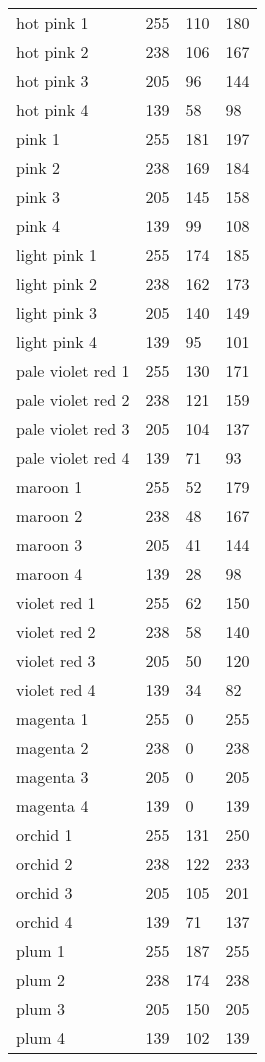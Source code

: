 \begin{center}
\begin{tabular}{llll}
  hot pink 1 & 255 & 110 & 180  \\
  hot pink 2 & 238 & 106 & 167  \\
  hot pink 3 & 205 & 96 & 144  \\
  hot pink 4 & 139 & 58 & 98  \\
  pink 1 & 255 & 181 & 197  \\
  pink 2 & 238 & 169 & 184  \\
  pink 3 & 205 & 145 & 158  \\
  pink 4 & 139 & 99 & 108  \\
  light pink 1 & 255 & 174 & 185  \\
  light pink 2 & 238 & 162 & 173  \\
  light pink 3 & 205 & 140 & 149  \\
  light pink 4 & 139 & 95 & 101  \\
  pale violet red 1 & 255 & 130 & 171  \\
  pale violet red 2 & 238 & 121 & 159  \\
  pale violet red 3 & 205 & 104 & 137  \\
  pale violet red 4 & 139 & 71 & 93  \\
  maroon 1 & 255 & 52 & 179  \\
  maroon 2 & 238 & 48 & 167  \\
  maroon 3 & 205 & 41 & 144  \\
  maroon 4 & 139 & 28 & 98  \\
  violet red 1 & 255 & 62 & 150  \\
  violet red 2 & 238 & 58 & 140  \\
  violet red 3 & 205 & 50 & 120  \\
  violet red 4 & 139 & 34 & 82  \\
  magenta 1 & 255 & 0 & 255  \\
  magenta 2 & 238 & 0 & 238  \\
  magenta 3 & 205 & 0 & 205  \\
  magenta 4 & 139 & 0 & 139  \\
  orchid 1 & 255 & 131 & 250  \\
  orchid 2 & 238 & 122 & 233  \\
  orchid 3 & 205 & 105 & 201  \\
  orchid 4 & 139 & 71 & 137  \\
  plum 1 & 255 & 187 & 255  \\
  plum 2 & 238 & 174 & 238  \\
  plum 3 & 205 & 150 & 205  \\
  plum 4 & 139 & 102 & 139  \\

\end{tabular}
\end{center}
